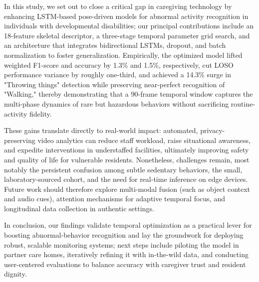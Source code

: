 \documentclass{iopconfser}
\begin{document}
In this study, we set out to close a critical gap in caregiving technology by enhancing LSTM-based pose-driven models for abnormal activity recognition in individuals with developmental disabilities; our principal contributions include an 18-feature skeletal descriptor, a three-stage temporal parameter grid search, and an architecture that integrates bidirectional LSTMs, dropout, and batch normalization to foster generalization. Empirically, the optimized model lifted weighted F1-score and accuracy by 1.3\% and 1.5\%, respectively, cut LOSO performance variance by roughly one-third, and achieved a 14.3\% surge in "Throwing things" detection while preserving near-perfect recognition of "Walking," thereby demonstrating that a 90-frame temporal window captures the multi-phase dynamics of rare but hazardous behaviors without sacrificing routine-activity fidelity.

These gains translate directly to real-world impact: automated, privacy-preserving video analytics can reduce staff workload, raise situational awareness, and expedite interventions in understaffed facilities, ultimately improving safety and quality of life for vulnerable residents. Nonetheless, challenges remain, most notably the persistent confusion among subtle sedentary behaviors, the small, laboratory-sourced cohort, and the need for real-time inference on edge devices. Future work should therefore explore multi-modal fusion (such as object context and audio cues), attention mechanisms for adaptive temporal focus, and longitudinal data collection in authentic settings.

In conclusion, our findings validate temporal optimization as a practical lever for boosting abnormal-behavior recognition and lay the groundwork for deploying robust, scalable monitoring systems; next steps include piloting the model in partner care homes, iteratively refining it with in-the-wild data, and conducting user-centered evaluations to balance accuracy with caregiver trust and resident dignity.



\end{document}
